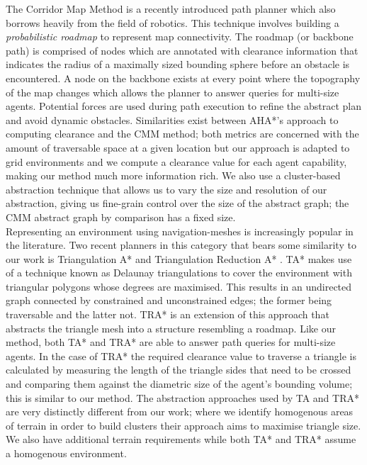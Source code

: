 The Corridor Map Method \cite{geraerts07} is a recently introduced path planner which also borrows heavily from the field of robotics. This technique involves building a \emph{probabilistic roadmap} to represent map connectivity. The roadmap (or backbone path) is comprised of nodes which are annotated with clearance information that indicates the radius of a maximally sized bounding sphere before an obstacle is encountered. A node on the backbone exists at every point where the topography of the map changes which allows the planner to answer queries for multi-size agents. Potential forces are used during path execution to refine the abstract plan and avoid dynamic obstacles. \newline
Similarities exist between AHA*'s approach to computing clearance and the CMM  method; both metrics are concerned with the amount of traversable space at a given location but our approach is adapted to grid environments and we compute a clearance value for each agent capability, making our method much more information rich. We also use a cluster-based abstraction technique that allows us to vary the size and resolution of our abstraction, giving us fine-grain control over the size of the abstract graph; the CMM abstract graph by comparison has a fixed size. \\ \newline
Representing an environment using navigation-meshes is increasingly popular in the literature. Two recent planners in this category that bears some similarity to our work is Triangulation A* and Triangulation Reduction A* \cite{demyen07}. TA* makes use of a technique known as Delaunay triangulations to cover the environment with triangular polygons whose degrees are maximised. This results in an undirected graph connected by constrained and unconstrained edges; the former being traversable and the latter not. TRA* is an extension of this approach that abstracts the triangle mesh into a structure resembling a roadmap. 
Like our method, both TA* and TRA* are able to answer path queries for multi-size agents. 
In the case of TRA* the required clearance value to traverse a triangle is calculated by measuring the length of the triangle sides that need to be crossed and comparing them against the diametric size of the agent's bounding volume; this is similar to our method. The abstraction approaches used by TA and TRA* are very distinctly different from our work; where we identify homogenous areas of terrain in order to build clusters their approach aims to maximise triangle size. We also have additional terrain requirements while both TA* and TRA* assume a homogenous environment.


